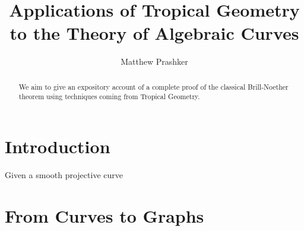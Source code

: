 \documentclass{article}
\title{Applications of Tropical Geometry to the Theory of Algebraic Curves}
\author{Matthew Prashker}
\begin{document}
\maketitle

\begin{abstract}
\noindent
We aim to give an expository account of a complete proof of the classical Brill-Noether theorem using techniques coming from Tropical Geometry.
\end{abstract}
\section{Introduction}
Given a smooth projective curve 
\section{From Curves to Graphs}
\end{document}

